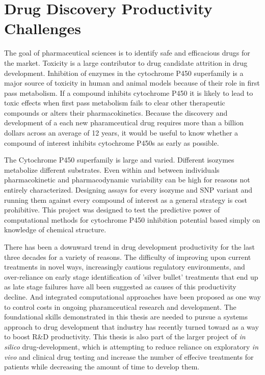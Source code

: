 
\section{Drug Discovery Productivity Challenges}

The goal of pharmaceutical sciences is to identify safe and efficacious drugs for the market. Toxicity is a large contributor to drug candidate attrition in drug development. Inhibition of enzymes in the cytochrome P450 superfamily is a major source of toxicity in human and animal models because of their role in first pass metabolism. If a compound inhibits cytochrome P450 it is likely to lead to toxic effects when first pass metabolism fails to clear other therapeutic compounds or alters their pharmacokinetics. Because the discovery and development of a each new pharamceutical drug requires more than a billion dollars across an average of 12 years, it would be useful to know whether a compound of interest inhibits cytochrome P450s as early as possible.

The Cytochrome P450 superfamily is large and varied. Different isozymes metabolize different substrates. Even within and between individuals pharmacokinetic and pharmacodynamic variability can be high for reasons not entirely characterized. Designing assays for every isozyme and SNP variant and running them against every compound of interest as a general strategy is cost prohibitive. This project was designed to test the predictive power of computational methods for cytochrome P450 inhibition potential based simply on knowledge of chemical structure.

There has been a downward trend in drug development productivity for the last three decades for a variety of reasons. The difficulty of improving upon current treatments in novel ways, increasingly cautious regulatory environments, and over-reliance on early stage identification of 'silver bullet' treatments that end up as late stage failures have all been suggested as causes of this productivity decline.  \cite{Scannell2012} And integrated computational approaches have been proposed as one way to control costs in ongoing pharamceutical research and development. \cite{Visser2014} The foundational skills demonstrated in this thesis are needed to pursue a systems approach to drug development that industry has recently turned toward as a way to boost R\&D productivity. \cite{Berg2014} This thesis is also part of the larger project of \textit{in silico} drug-development, which is attempting to reduce reliance on exploratory \textit{in vivo} and clinical drug testing and increase the number of effecive treatments for patients while decreasing the amount of time to develop them.


